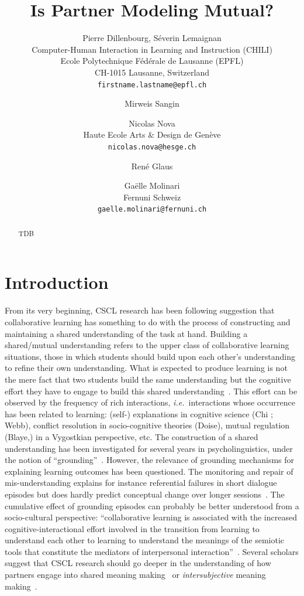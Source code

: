 \documentclass[twocolumn]{article}
\title{Is Partner Modeling Mutual?}
\author{
    Pierre Dillenbourg, Séverin Lemaignan \\
    \small Computer-Human Interaction in Learning and Instruction (CHILI) \\
    \small Ecole Polytechnique Fédérale de Lausanne (EPFL) \\
    \small CH-1015 Lausanne, Switzerland \\
    {\tt firstname.lastname@epfl.ch}
    \and
    Mirweis Sangin \\
    \and
    Nicolas Nova \\
    \small Haute Ecole Arts \& Design de Genève\\
    {\tt nicolas.nova@hesge.ch}
    \and
    René Glaus
    \and
    Gaëlle Molinari \\
    \small Fernuni Schweiz \\
    {\tt gaelle.molinari@fernuni.ch}
}
\newcommand{\ie}{{\textit{i.e.\ }}}
\begin{document}
\maketitle

\begin{abstract}
    TDB
\end{abstract}

\section{Introduction}


From its very beginning, CSCL research has been following
\citet{roschelle1995construction} suggestion that collaborative learning has
something to do with the process of constructing and maintaining a shared
understanding of the task at hand. Building a shared/mutual understanding refers
to the upper class of collaborative learning situations, those in which students
should build upon each other's understanding to refine their own understanding.
What is expected to produce learning is not the mere fact that two students
build the same understanding but the cognitive effort they have to engage to
build this shared understanding~\citep{schwartz1995emergence}. This effort can
be observed by the frequency of rich interactions, \ie interactions whose
occurrence has been related to learning: (self-) explanations in cognitive
science (Chi ; Webb), conflict resolution in socio-cognitive theories (Doise),
mutual regulation (Blaye,) in a Vygostkian perspective, etc. The construction of
a shared understanding has been investigated for several years in
psycholinguistics, under the  notion of
``grounding''~\citep{clark1986referring}.  However, the relevance of grounding
mechanisms for explaining learning outcomes has been questioned. The monitoring
and repair of mis-understanding explains for instance referential failures in
short dialogue episodes but does hardly predict conceptual change over longer
sessions~\citep{dillenbourg2006sharing}. The cumulative effect of grounding
episodes can probably be better understood from a socio-cultural perspective:
``collaborative learning is associated with the increased
cognitive-interactional effort involved in the transition from learning to
understand each other to learning to understand the meanings of the semiotic
tools that constitute the mediators of interpersonal
interaction''~\citep{baker1999role}.  Several scholars suggest that CSCL
research should go deeper in the understanding of how partners engage into
shared meaning making~\citep{stahl2007meaning} or \emph{intersubjective} meaning
making~\citep{suthers2006technology}.
\end{document}
